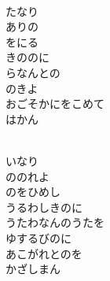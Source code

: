 \documentclass[10pt,b5j]{tarticle} %
\begin{document}
\vspace{1.5em} %
\newcommand{\linespace}{0.5em} %
\newcommand{\blocksize}{0.5\hsize} %
\newcommand{\itemmargin}{3em} %
\begin{enumerate} %
    \setlength{\itemindent}{\itemmargin} %
    \begin{minipage}[c]{\blocksize}
    
        \vspace{\linespace}
        \item~\\
        たなり\\
        ありの\\
        をにる\\
        きののに\\
        らなんとの\\
        のきよ\\
        おごそかにをこめて\\
        はかん
        
    \end{minipage}
    \begin{minipage}[c]{\blocksize}
        
        \vspace{\linespace}
        \item~\\
        いなり\\
        ののれよ\\
        のをひめし\\
        うるわしきのに\\
        うたわなんのうたを\\
        ゆするびのに\\
        あこがれとのを\\
        かざしまん
        
    \end{minipage}
    \begin{minipage}[c]{\blocksize}
        

\end{minipage}
\end{enumerate}
\end{document}
